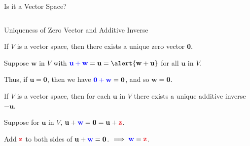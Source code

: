 \documentclass[xcolor=dvipsnames,aspectratio=169,t]{beamer}
\begin{document}
\begin{frame}{Is it a Vector Space?}
\begin{columns}[T]
\ms

\ii {} \ms

\ii {}
\ee

\end{columns}


\end{frame}

\begin{frame}{Uniqueness of Zero Vector and Additive Inverse}

\bbox
If $V$ is a vector space, then there exists a unique zero vector $\mathbf{0}$.
\ebox

Suppose $\mathbf{w}$ in $V$ with $\colorb{\mathbf{u} + \mathbf{w}} =  \mathbf{u} = \alert{\mathbf{w} + \mathbf{u}}$ for all $\mathbf{u}$ in $V$. 

Thus, if $\mathbf{u} = \mathbf{0}$, then we have $\textcolor{blue}{ \mathbf{0} + \mathbf{w}} = \mathbf{0}$,
and so $\mathbf{w} = \mathbf{0}$.

\bigskip

\pause
\bbox
If $V$ is a vector space, then for each $\mathbf{u}$ in $V$ there exists a unique additive inverse $-\mathbf{u}$.
\ebox

Suppose for $\mathbf{u}$ in $V$, $\mathbf{u}+\colorb{\mathbf{w}}=\mathbf{0}=\mathbf{u}+\colorr{\mathbf{z}}$.

Add $\colorr{\mathbf{z}}$ to both sides of $\mathbf{u}+\textcolor{blue}{\mathbf{w}}=\mathbf{0}$.
$\implies \colorb{\mathbf{w}}=\colorr{\mathbf{z}}$.

\end{frame}
\end{document}
